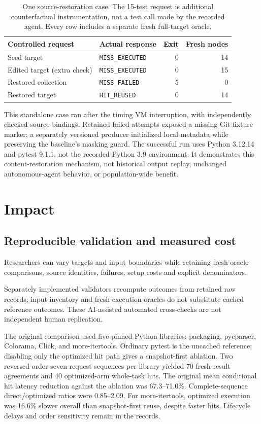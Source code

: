 \documentclass[preprint,12pt,a4paper]{elsarticle}
\newcommand{\code}[1]{\texttt{#1}}
\begin{document}
\begin{table}[htbp]
\centering\small
\begin{tabular}{llrr}
\toprule
Controlled request & Actual response & Exit & Fresh nodes \\
\midrule
Seed target & \code{MISS\_EXECUTED} & 0 & 14 \\
Edited target (extra check) & \code{MISS\_EXECUTED} & 0 & 15 \\
Restored collection & \code{MISS\_FAILED} & 5 & 0 \\
Restored target & \code{HIT\_REUSED} & 0 & 14 \\
\bottomrule
\end{tabular}
\caption{One source-restoration case. The 15-test request is additional counterfactual instrumentation, not a test call made by the recorded agent. Every row includes a separate fresh full-target oracle.}
\label{tab:state-rejoin}
\end{table}

This standalone case ran after the timing VM interruption, with independently checked source bindings. Retained failed attempts exposed a missing Git-fixture marker; a separately versioned producer initialized local metadata while preserving the baseline's masking guard. The successful run uses Python 3.12.14 and pytest 9.1.1, not the recorded Python 3.9 environment. It demonstrates this content-restoration mechanism, not historical output replay, unchanged autonomous-agent behavior, or population-wide benefit.

\section{Impact}
\subsection{Reproducible validation and measured cost}
Researchers can vary targets and input boundaries while retaining fresh-oracle comparisons, source identities, failures, setup costs and explicit denominators.

Separately implemented validators recompute outcomes from retained raw records; input-inventory and fresh-execution oracles do not substitute cached reference outcomes. These AI-assisted automated cross-checks are not independent human replication.

The original comparison used five pinned Python libraries: packaging, pycparser, Colorama, Click, and more-itertools. Ordinary pytest is the uncached reference; disabling only the optimized hit path gives a snapshot-first ablation. Two reversed-order seven-request sequences per library yielded 70 fresh-result agreements and 40 optimized-arm whole-task hits. The original mean conditional hit latency reduction against the ablation was 67.3--71.0\%. Complete-sequence direct/optimized ratios were 0.85--2.09. For more-itertools, optimized execution was 16.6\% slower overall than snapshot-first reuse, despite faster hits. Lifecycle delays and order sensitivity remain in the records.
\end{document}
